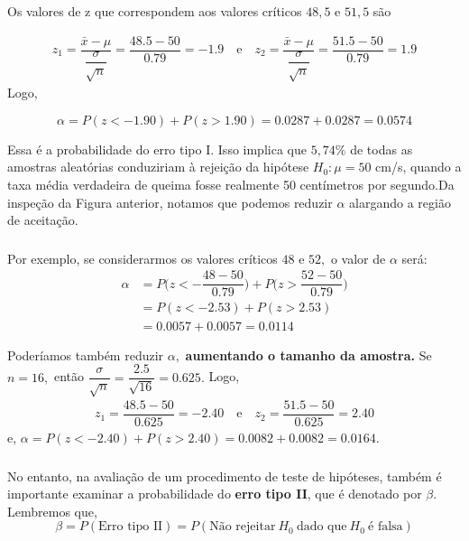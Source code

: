 \documentclass[14pt,aspectratio=1610]{beamer}
\newcommand{\bx}{\ensuremath{\bar{x}}}
\newcommand{\Ho}{\ensuremath{H_{0}}}
\begin{document}
\begin{frame}{}
\frametitle{}
\small
\begin{block}{}
\justifying
Os valores de z que correspondem aos valores críticos $48,5$ e $51,5$ são

\begin{align*}
z_{1}=\dfrac{\bx-\mu}{\dfrac{\sigma}{\sqrt{n}}}=\dfrac{48.5-50}{0.79}=-1.9\quad \textrm{e}\quad z_{2}=\dfrac{\bx-\mu}{\dfrac{\sigma}{\sqrt{n}}}=\dfrac{51.5-50}{0.79}=1.9
\end{align*}
Logo,

$$\alpha=P(z<-1.90)+P(z>1.90)=0.0287+0.0287=0.0574$$

Essa é a probabilidade do erro tipo I. Isso implica que $5,74\%$ de todas as amostras aleatórias conduziriam à rejeição da hipótese $\Ho: \mu = 50$ cm/s, quando a 
taxa média verdadeira de queima fosse realmente 50 centímetros por segundo.Da inspeção da Figura anterior, notamos que podemos reduzir $\alpha$ alargando a 
região de aceitação.
\end{block}
\end{frame}

\begin{frame}{}
\frametitle{}
\small
\begin{block}{}
\justifying
Por exemplo, se considerarmos os valores críticos $48$ e $52,$ o valor de $\alpha$ será:
\begin{align*}
\alpha&=P\Biggl(z<-\dfrac{48-50}{0.79}\Biggl)+P\Biggl(z>\dfrac{52-50}{0.79}\Biggl)\\
&=P(z<-2.53)+P(z>2.53)\\
&=0.0057+0.0057=0.0114
\end{align*}
\end{block}
\pause
\begin{block}{}
Poderíamos também reduzir $\alpha,$ \textbf{aumentando o tamanho da amostra.} Se $n = 16,$ então $\dfrac{\sigma}{\sqrt{n}}=\dfrac{2.5}{\sqrt{16}}=0.625.$ Logo,
\begin{align*}
z_{1}=\dfrac{48.5-50}{0.625}=-2.40\quad \textrm{e}\quad z_{2}=\dfrac{51.5-50}{0.625}=2.40
\end{align*}
e, $\alpha=P(z<-2.40)+P(z>2.40)=0.0082+0.0082=0.0164.$
\end{block}
\end{frame}

\begin{frame}{}
\frametitle{}
\begin{block}{}
\justifying
No entanto, na avaliação de um procedimento de teste de hipóteses, também é importante examinar a probabilidade do \textbf{erro tipo II}, que é denotado por $\beta.$ 
Lembremos que, $$ \beta=P(\textrm{Erro tipo II})=P(\textrm{Não rejeitar}\ \Ho\ \textrm{dado que}\ \Ho\ \textrm{é falsa})$$
\end{block}
\end{frame}
\end{document}
